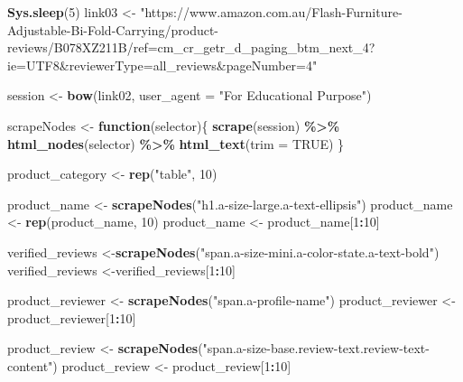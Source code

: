 \documentclass[
]{article}
\newenvironment{Shaded}{\begin{snugshade}}{\end{snugshade}}
\newcommand{\AttributeTok}[1]{\textcolor[rgb]{0.13,0.29,0.53}{#1}}
\newcommand{\ConstantTok}[1]{\textcolor[rgb]{0.56,0.35,0.01}{#1}}
\newcommand{\ControlFlowTok}[1]{\textcolor[rgb]{0.13,0.29,0.53}{\textbf{#1}}}
\newcommand{\DecValTok}[1]{\textcolor[rgb]{0.00,0.00,0.81}{#1}}
\newcommand{\FunctionTok}[1]{\textcolor[rgb]{0.13,0.29,0.53}{\textbf{#1}}}
\newcommand{\NormalTok}[1]{#1}
\newcommand{\OtherTok}[1]{\textcolor[rgb]{0.56,0.35,0.01}{#1}}
\newcommand{\SpecialCharTok}[1]{\textcolor[rgb]{0.81,0.36,0.00}{\textbf{#1}}}
\newcommand{\StringTok}[1]{\textcolor[rgb]{0.31,0.60,0.02}{#1}}
\begin{document}
\begin{Shaded}
\begin{Highlighting}[]
   \FunctionTok{Sys.sleep}\NormalTok{(}\DecValTok{5}\NormalTok{)}
\NormalTok{link03 }\OtherTok{\textless{}{-}} \StringTok{"https://www.amazon.com.au/Flash{-}Furniture{-}Adjustable{-}Bi{-}Fold{-}Carrying/product{-}reviews/B078XZ211B/ref=cm\_cr\_getr\_d\_paging\_btm\_next\_4?ie=UTF8\&reviewerType=all\_reviews\&pageNumber=4"}


\NormalTok{  session }\OtherTok{\textless{}{-}} \FunctionTok{bow}\NormalTok{(link02,}
               \AttributeTok{user\_agent =} \StringTok{"For Educational Purpose"}\NormalTok{)}

\NormalTok{  scrapeNodes }\OtherTok{\textless{}{-}} \ControlFlowTok{function}\NormalTok{(selector)\{}
    \FunctionTok{scrape}\NormalTok{(session) }\SpecialCharTok{\%\textgreater{}\%}
      \FunctionTok{html\_nodes}\NormalTok{(selector) }\SpecialCharTok{\%\textgreater{}\%}
      \FunctionTok{html\_text}\NormalTok{(}\AttributeTok{trim =} \ConstantTok{TRUE}\NormalTok{)}
\NormalTok{  \}}

\NormalTok{  product\_category }\OtherTok{\textless{}{-}} \FunctionTok{rep}\NormalTok{(}\StringTok{"table"}\NormalTok{, }\DecValTok{10}\NormalTok{)}

\NormalTok{  product\_name }\OtherTok{\textless{}{-}} \FunctionTok{scrapeNodes}\NormalTok{(}\StringTok{"h1.a{-}size{-}large.a{-}text{-}ellipsis"}\NormalTok{)}
\NormalTok{  product\_name }\OtherTok{\textless{}{-}} \FunctionTok{rep}\NormalTok{(product\_name, }\DecValTok{10}\NormalTok{)}
\NormalTok{  product\_name }\OtherTok{\textless{}{-}}\NormalTok{ product\_name[}\DecValTok{1}\SpecialCharTok{:}\DecValTok{10}\NormalTok{]}
  
\NormalTok{  verified\_reviews }\OtherTok{\textless{}{-}}\FunctionTok{scrapeNodes}\NormalTok{(}\StringTok{"span.a{-}size{-}mini.a{-}color{-}state.a{-}text{-}bold"}\NormalTok{)}
\NormalTok{  verified\_reviews }\OtherTok{\textless{}{-}}\NormalTok{verified\_reviews[}\DecValTok{1}\SpecialCharTok{:}\DecValTok{10}\NormalTok{]}
  
\NormalTok{  product\_reviewer }\OtherTok{\textless{}{-}} \FunctionTok{scrapeNodes}\NormalTok{(}\StringTok{"span.a{-}profile{-}name"}\NormalTok{)}
\NormalTok{  product\_reviewer }\OtherTok{\textless{}{-}}\NormalTok{ product\_reviewer[}\DecValTok{1}\SpecialCharTok{:}\DecValTok{10}\NormalTok{]}
  
\NormalTok{  product\_review }\OtherTok{\textless{}{-}} \FunctionTok{scrapeNodes}\NormalTok{(}\StringTok{"span.a{-}size{-}base.review{-}text.review{-}text{-}content"}\NormalTok{)}
\NormalTok{  product\_review }\OtherTok{\textless{}{-}}\NormalTok{ product\_review[}\DecValTok{1}\SpecialCharTok{:}\DecValTok{10}\NormalTok{]}
  

\end{Highlighting}
\end{Shaded}
\end{document}
